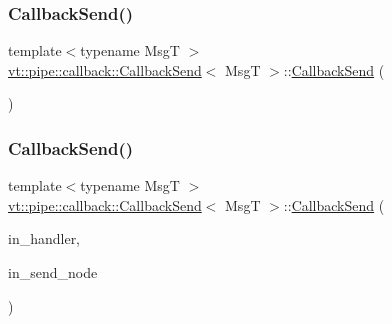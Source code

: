 \mbox{\label{structvt_1_1pipe_1_1callback_1_1_callback_send_accc854042b241e9e5149f4c48da57ed1}} 
\subsubsection{\texorpdfstring{Callback\+Send()}{CallbackSend()}\hspace{0.1cm}{\footnotesize\ttfamily [3/4]}}
{\footnotesize\ttfamily template$<$typename MsgT $>$ \\
\hyperlink{structvt_1_1pipe_1_1callback_1_1_callback_send}{vt\+::pipe\+::callback\+::\+Callback\+Send}$<$ MsgT $>$\+::\hyperlink{structvt_1_1pipe_1_1callback_1_1_callback_send}{Callback\+Send} (\begin{DoxyParamCaption}\item[{\hyperlink{structvt_1_1pipe_1_1callback_1_1_callback_send}{Callback\+Send}$<$ MsgT $>$ \&\&}]{ }\end{DoxyParamCaption})\hspace{0.3cm}{\ttfamily [default]}}

\mbox{\label{structvt_1_1pipe_1_1callback_1_1_callback_send_a97b27637052dc74f0f500f250ddbb9b7}} 
\subsubsection{\texorpdfstring{Callback\+Send()}{CallbackSend()}\hspace{0.1cm}{\footnotesize\ttfamily [4/4]}}
{\footnotesize\ttfamily template$<$typename MsgT $>$ \\
\hyperlink{structvt_1_1pipe_1_1callback_1_1_callback_send}{vt\+::pipe\+::callback\+::\+Callback\+Send}$<$ MsgT $>$\+::\hyperlink{structvt_1_1pipe_1_1callback_1_1_callback_send}{Callback\+Send} (\begin{DoxyParamCaption}\item[{\hyperlink{namespacevt_af64846b57dfcaf104da3ef6967917573}{Handler\+Type} const}]{in\+\_\+handler,  }\item[{\hyperlink{namespacevt_a866da9d0efc19c0a1ce79e9e492f47e2}{Node\+Type} const \&}]{in\+\_\+send\+\_\+node }\end{DoxyParamCaption})}



